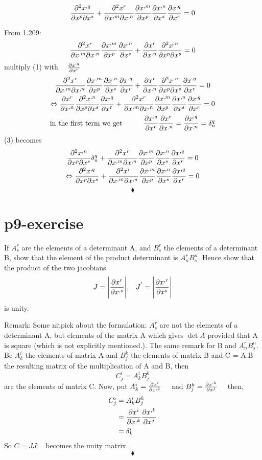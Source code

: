 \begin{tcolorbox}
$$\pdv{x^{,q}}{x^{p}}{x^{s}}+\pdv{x^{r}}{x^{,m}}{x^{,n}}\pdv{x^{,m}}{x^{p}}\pdv{x^{,n}}{x^{s}}\pdv{x^{,q}}{x^{r}} = 0 $$
\end{tcolorbox}
From 1.209:
\begin{gather} 
\pdv{x^r}{x^{,m}}{x^{,n}}\pdv{x^{,m}}{x^{p}}\pdv{x^{,n}}{x^{s}}+\pdv{x^r}{x^{,n}}\pdv{x^{,n}}{x^p}{x^{s}} = 0
\end{gather}
 multiply (1)  with $\quad\pdv{x^{,q}}{x^{r}}$
\begin{gather} 
\pdv{x^r}{x^{,m}}{x^{,n}}\pdv{x^{,m}}{x^{p}}\pdv{x^{,n}}{x^{s}}\pdv{x^{,q}}{x^{r}}+\pdv{x^r}{x^{,n}}\pdv{x^{,n}}{x^p}{x^{s}}\pdv{x^{,q}}{x^{r}} = 0\\
\Leftrightarrow\pdv{x^r}{x^{,n}}\pdv{x^{,n}}{x^p}{x^{s}}\pdv{x^{,q}}{x^{r}}+ \pdv{x^r}{x^{,m}}{x^{,n}}\pdv{x^{,m}}{x^{p}}\pdv{x^{,n}}{x^{s}}\pdv{x^{,q}}{x^{r}}= 0
\end{gather}
\begin{gather} 
\text{\centering in the first term we get\quad\quad}\quad \pdv{x^{,q}}{x^{r}}\pdv{x^r}{x^{,n}} = \pdv{x^{,q}}{x^{,n}} = \delta_n^q
\end{gather}
(3) becomes
\begin{gather} 
\pdv{x^{,n}}{x^p}{x^{s}}\delta_n^q + \pdv{x^r}{x^{,m}}{x^{,n}}\pdv{x^{,m}}{x^{p}}\pdv{x^{,n}}{x^{s}}\pdv{x^{,q}}{x^{r}}=  0\\
\Leftrightarrow\pdv{x^{,q}}{x^p}{x^{s}} + \pdv{x^r}{x^{,m}}{x^{,n}}\pdv{x^{,m}}{x^{p}}\pdv{x^{,n}}{x^{s}}\pdv{x^{,q}}{x^{r}}= 0
\end{gather} 
$$\blacklozenge$$
\pagebreak[4]



\section{p9-exercise}

\begin{tcolorbox}
If $A_s^r$ are the elements of a determinant A, and $B_s^r$ the elements of a determinant B, show that the element of the product determinant is $A_n^rB^n_s$. Hence show that the product of the two jacobians
$$J =\Bigg|\pdv{x^{r}}{x^{,s}}\Bigg|\text{,}\quad J^{'} = \Bigg|\pdv{x^{,r}}{x^{s}}\Bigg|$$
is unity.
\end{tcolorbox}
Remark: Some nitpick about the formulation: $A_s^r$ are not the elements of a determinant A, but elements of the matrix A which gives $\det{A}$ provided that A is square (which is not explicitly mentioned.). The same remark for B and $A_n^rB^n_s$.\\
Be $A^i_k $ the elements of matrix A and $B^k_j $ the elements of matrix B and C = A.B the resulting matrix of the multiplication of A and B, then
$$C^i_j  = A^i_kB^k_j $$
are the elements of matrix C.
Now, put $A^i_k =\pdv{x^{i}}{x^{,k}} \quad$ and $B^k_j =\pdv{x^{,k}}{x^{j}} \quad$ then,
\begin{align}
C^{i}_{j}  &= A^{i}_{k}B^{k}_{j} \\
&=\pdv{x^{i}}{x^{,k}}\pdv{x^{,k}}{x^{j}}\\
&= \delta^{i}_{k}
\end{align}
So $C = JJ^{,}\quad$becomes the unity matrix. 
$$\blacklozenge$$
\pagebreak[4]

